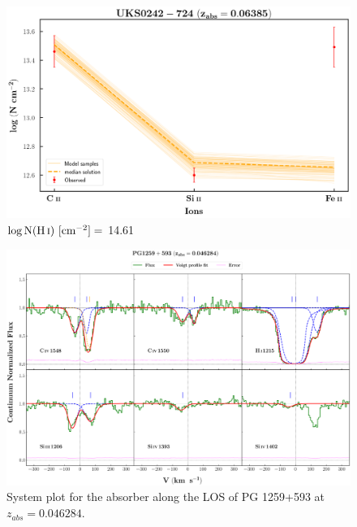   \begin{figure}[!h]
    \centering
    \includegraphics[width=0.9\linewidth]{Ionisation-Modelling-Plots/uks0242-z=0.06385-compI_logZ=1.png}
    \caption{$\log \text{N}(\ion{H}{i}) \ [\text{cm}^{-2}]=$ 14.61}
  \end{figure}
  
  
  
  \newpage
  
  \begin{landscape}
  
  \begin{figure}
      \centering
      \vspace{-20mm}
      \hspace*{-35mm}
      \includegraphics[width=1.25\linewidth]{System-Plots/PG1259+593_z=0.046284_sys_plot.png}
      \caption{System plot for the absorber along the LOS of PG 1259+593 at $z_{abs} = 0.046284$. }
  \end{figure}
  
  \end{landscape}
  
